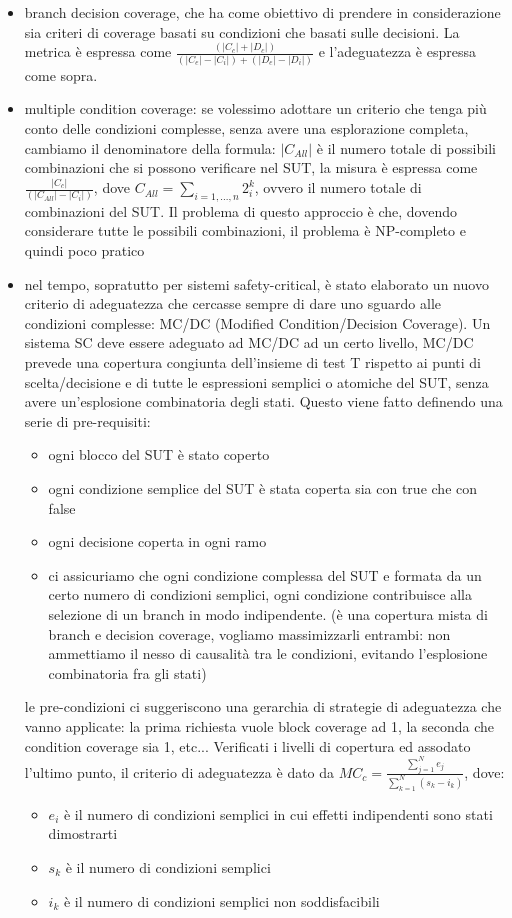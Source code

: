 \documentclass{article}
\begin{document}
\begin{itemize}
\item branch decision coverage, che ha come obiettivo di prendere in considerazione sia criteri di coverage basati su condizioni che basati sulle decisioni. La metrica è espressa come $\frac{(|C_c| + |D_c|)}{(|C_e| - |C_i|) + (|D_e| - |D_i|)}$ e l'adeguatezza è espressa come sopra.
\item multiple condition coverage: se volessimo adottare un criterio che tenga più conto delle condizioni complesse, senza avere una esplorazione completa, cambiamo il denominatore della formula: $|C_{All}|$ è il numero totale di possibili combinazioni che si possono verificare nel SUT, la misura è espressa come $\frac{|C_c|}{(|C_{All}| - |C_i|)}$, dove $C_{All} = \sum\limits_{i=1,...,n} 2_i^k$, ovvero il numero totale di combinazioni del SUT. Il problema di questo approccio è che, dovendo considerare tutte le possibili combinazioni, il problema è NP-completo e quindi poco pratico
\item nel tempo, sopratutto per sistemi safety-critical, è stato elaborato un nuovo criterio di adeguatezza che cercasse sempre di dare uno sguardo alle condizioni complesse: MC/DC (Modified Condition/Decision Coverage). Un sistema SC deve essere adeguato ad MC/DC ad un certo livello, MC/DC prevede una copertura congiunta dell'insieme di test T rispetto ai punti di scelta/decisione e di tutte le espressioni semplici o atomiche del SUT, senza avere un'esplosione combinatoria degli stati. Questo viene fatto definendo una serie di pre-requisiti:
\begin{itemize}
\item ogni blocco del SUT è stato coperto
\item ogni condizione semplice del SUT è stata coperta sia con true che con false
\item ogni decisione coperta in ogni ramo
\item ci assicuriamo che ogni condizione complessa del SUT e formata da un certo numero di condizioni semplici, ogni condizione contribuisce alla selezione di un branch in modo indipendente. (è una copertura mista di branch e decision coverage, vogliamo massimizzarli entrambi: non ammettiamo il nesso di causalità tra le condizioni, evitando l'esplosione combinatoria fra gli stati)
\end{itemize}
le pre-condizioni ci suggeriscono una gerarchia di strategie di adeguatezza che vanno applicate: la prima richiesta vuole block coverage ad 1, la seconda che condition coverage sia 1, etc... Verificati i livelli di copertura ed assodato l'ultimo punto, il criterio di adeguatezza è dato da $MC_{c} = \frac{\sum\limits_{j=1}^{N} e_j}{\sum\limits_{k=1}^{N} (s_k - i_k)}$, dove:
\begin{itemize}
\item $e_i$ è il numero di condizioni semplici in cui effetti indipendenti sono stati dimostrarti
\item $s_k$ è il numero di condizioni semplici
\item $i_k$ è il numero di condizioni semplici non soddisfacibili
\end{itemize}
\end{itemize}
\end{document}
